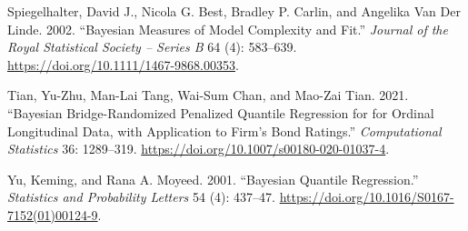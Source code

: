 \begin{CSLReferences}{1}{0}
\leavevmode{}%
Spiegelhalter, David J., Nicola G. Best, Bradley P. Carlin, and Angelika Van Der Linde. 2002. {``Bayesian Measures of Model Complexity and Fit.''} \emph{{Journal of the Royal Statistical Society -- Series B}} 64 (4): 583--639. \url{https://doi.org/10.1111/1467-9868.00353}.

\leavevmode{}%
Tian, Yu-Zhu, Man-Lai Tang, Wai-Sum Chan, and Mao-Zai Tian. 2021. {``Bayesian Bridge-Randomized Penalized Quantile Regression for for Ordinal Longitudinal Data, with Application to Firm's Bond Ratings.''} \emph{Computational Statistics} 36: 1289--319. \url{https://doi.org/10.1007/s00180-020-01037-4}.

\leavevmode{}%
Yu, Keming, and Rana A. Moyeed. 2001. {``Bayesian Quantile Regression.''} \emph{Statistics and Probability Letters} 54 (4): 437--47. \url{https://doi.org/10.1016/S0167-7152(01)00124-9}.

\end{CSLReferences}



\address{%
Prajual Maheshwari\\
Quantitative Researcher, Ogha Research\\%
2123, 14th Main Road, HAL 3rd Stage, Kodihalli, Bengaluru, Karnataka, India\\
%
\url{https://prajual.netlify.app}\\%
%
\href{mailto:prajual1391@gmail.com}{\nolinkurl{prajual1391@gmail.com}}%
}

\address{%
Mohammad Arshad Rahman\\
Department of Economic Sciences, Indian Institute of Technology Kanpur\\%
Room 672, Faculty Building, Indian Institute of Technology Kanpur, India\\
%
\url{https://www.arshadrahman.com}\\%
\textit{ORCiD: \href{https://orcid.org/0000-0001-8434-0042}{0000-0001-8434-0042}}\\%
\href{mailto:marshad@iitk.ac.in}{\nolinkurl{marshad@iitk.ac.in}}, \href{mailto:arshadrahman25@gmail.com}{\nolinkurl{arshadrahman25@gmail.com}}%
}
